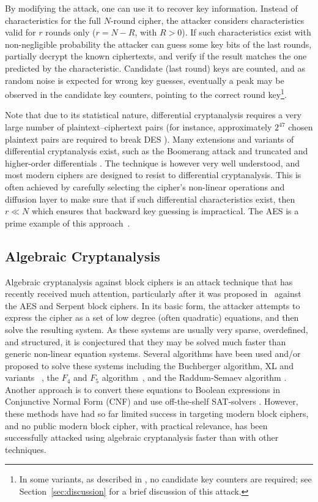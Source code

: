 \documentclass{llncs}
\begin{document}
By modifying the attack, one can use it to recover key information. Instead
of characteristics for the full $N$-round cipher, the attacker considers
characteristics valid for $r$ rounds only ($r = N - R
$, with $R>0$). If such characteristics exist with non-negligible probability
the attacker
can guess some key bits of the last rounds, partially decrypt the known
ciphertexts, and verify if the result matches the one predicted by the
characteristic. Candidate (last round) keys are counted, and as random noise is
expected for wrong key guesses, eventually a peak may be observed in the
candidate key counters, pointing to the correct round key\footnote{In some
variants, as described in \cite{fulldes-dc}, no candidate key counters are
required; see Section~\ref{sec:discussion} for a brief discussion of this
attack.}.

Note that due to its statistical nature, differential cryptanalysis requires a
very large number of plaintext--ciphertext pairs (for instance, approximately
$2^{47}$ chosen plaintext pairs are required to break DES \cite{fulldes-dc}).
Many extensions and variants of differential cryptanalysis exist, such as
the Boomerang attack \cite{Wagner1999} and truncated and higher-order
differentials \cite{Knudsen1995}. The technique is however very well understood,
and most modern ciphers are designed to resist to differential cryptanalysis.
This is often achieved by carefully selecting the cipher's non-linear operations
and diffusion layer to make sure that if such differential characteristics
exist, then $r \ll N$ which ensures that backward key guessing is impractical.
The AES is a prime example of this approach~\cite{Daemen2002}.

\subsection{Algebraic Cryptanalysis}

Algebraic cryptanalysis against block ciphers is an attack
technique that has recently received much attention, particularly after it was
proposed in~\cite{xslpub} against the AES and Serpent block ciphers. In
its basic form, the attacker attempts to express the cipher as a set
of low degree (often quadratic) equations, and then solve the resulting system.
As these systems are usually very sparse, overdefined, and structured, it is
conjectured that they may be solved much faster than generic non-linear equation
systems. Several algorithms have been used and/or proposed to solve these
systems including the Buchberger algorithm, XL and
variants~\cite{courtois-klimov-patarin-shamir:eurocrypt2000,Yang2004,xslpub} ,
the $F_4$ and $F_5$ algorithm~\cite{f4,f5}, and the Raddum-Semaev algorithm
\cite{Raddum2006}. Another approach is to convert these equations to
Boolean expressions in Conjunctive Normal Form (CNF) and use
off-the-shelf SAT-solvers \cite{Bard2007a}. However, these methods have had so
far limited success in targeting modern block ciphers, and no public modern
block cipher, with practical relevance, has been successfully attacked using
algebraic cryptanalysis faster than with other techniques.
\end{document}
